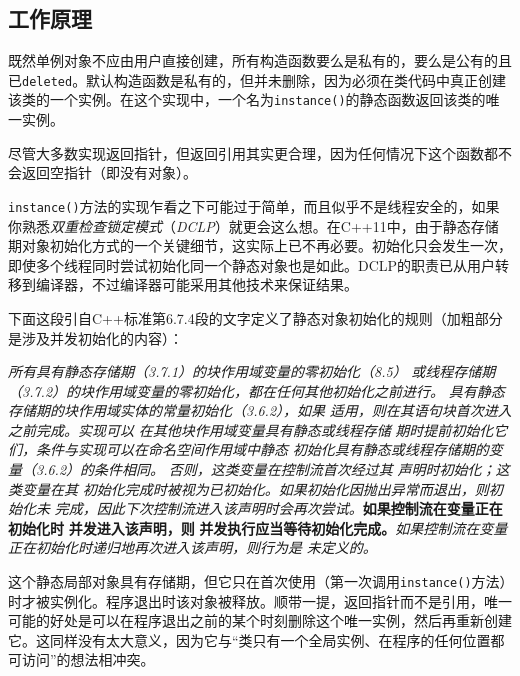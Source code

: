 
\subsection{工作原理}



既然单例对象不应由用户直接创建，所有构造函数要么是私有的，要么是公有的且已\texttt{deleted}。默认构造函数是私有的，但并未删除，因为必须在类代码中真正创建该类的一个实例。在这个实现中，一个名为\texttt{instance()}的静态函数返回该类的唯一实例。



\begin{myNote}[tip]
尽管大多数实现返回指针，但返回引用其实更合理，因为任何情况下这个函数都不会返回空指针（即没有对象）。
\end{myNote}



\texttt{instance()}方法的实现乍看之下可能过于简单，而且似乎不是线程安全的，如果你熟悉\textit{双重检查锁定模式}（\textit{DCLP}）就更会这么想。在C++11中，由于静态存储期对象初始化方式的一个关键细节，这实际上已不再必要。初始化只会发生一次，即使多个线程同时尝试初始化同一个静态对象也是如此。DCLP的职责已从用户转移到编译器，不过编译器可能采用其他技术来保证结果。



下面这段引自C++标准第6.7.4段的文字定义了静态对象初始化的规则（加粗部分是涉及并发初始化的内容）：



\textit{所有具有静态存储期（3.7.1）的块作用域变量的零初始化（8.5）} \textit{或线程存储期（3.7.2）的块作用域变量的零初始化，都在任何其他初始化之前进行。} \textit{具有静态存储期的块作用域实体的常量初始化（3.6.2），如果} \textit{适用，则在其语句块首次进入之前完成。实现可以} \textit{在其他块作用域变量具有静态或线程存储} \textit{期时提前初始化它们，条件与实现可以在命名空间作用域中静态} \textit{初始化具有静态或线程存储期的变量（3.6.2）的条件相同。} \textit{否则，这类变量在控制流首次经过其} \textit{声明时初始化；这类变量在其} \textit{初始化完成时被视为已初始化。如果初始化因抛出异常而退出，则初始化未} \textit{完成，因此下次控制流进入该声明时会再次尝试。}\textbf{如果控制流在变量正在初始化时} \textbf{并发进入该声明，则} \textbf{并发执行应当等待初始化完成。}\textit{如果控制流在变量正在初始化时递归地再次进入该声明，则行为是} \textit{未定义的。}



这个静态局部对象具有存储期，但它只在首次使用（第一次调用\texttt{instance()}方法）时才被实例化。程序退出时该对象被释放。顺带一提，返回指针而不是引用，唯一可能的好处是可以在程序退出之前的某个时刻删除这个唯一实例，然后再重新创建它。这同样没有太大意义，因为它与“类只有一个全局实例、在程序的任何位置都可访问”的想法相冲突。


